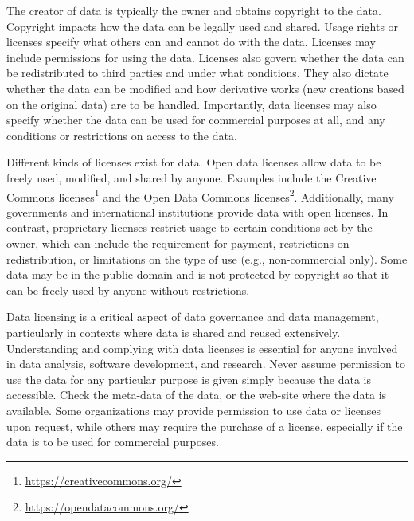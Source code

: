 The creator of data is typically the owner and obtains copyright to the data. Copyright impacts how the data can be legally used and shared. Usage rights or licenses specify what others can and cannot do with the data. Licenses may include permissions for using the data. Licenses also govern whether the data can be redistributed to third parties and under what conditions. They also dictate whether the data can be modified and how derivative works (new creations based on the original data) are to be handled. Importantly, data licenses may also specify whether the data can be used for commercial purposes at all, and any conditions or restrictions on access to the data.

Different kinds of licenses exist for data. Open data licenses allow data to be freely used, modified, and shared by anyone. Examples include the Creative Commons licenses\footnote{\url{https://creativecommons.org/}} and the Open Data Commons licenses\footnote{\url{https://opendatacommons.org/}}. Additionally, many governments and international institutions provide data with open licenses. In contrast, proprietary licenses restrict usage to certain conditions set by the owner, which can include the requirement for payment, restrictions on redistribution, or limitations on the type of use (e.g., non-commercial only). Some data may be in the public domain and is not protected by copyright so that it can be freely used by anyone without restrictions.

Data licensing is a critical aspect of data governance and data management, particularly in contexts where data is shared and reused extensively. Understanding and complying with data licenses is essential for anyone involved in data analysis, software development, and research. Never assume permission to use the data for any particular purpose is given simply because the data is accessible. Check the meta-data of the data, or the web-site where the data is available. Some organizations may provide permission to use data or licenses upon request, while others may require the purchase of a license, especially if the data is to be used for commercial purposes. 

